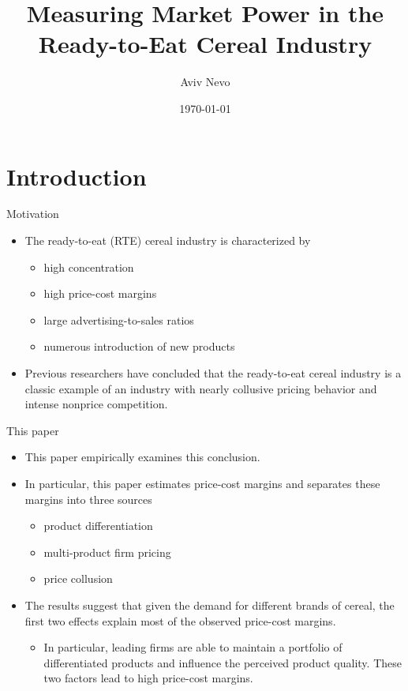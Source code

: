 \documentclass{beamer}
\title[ECMA, 2001]{Measuring Market Power in the Ready-to-Eat Cereal Industry}
\author{Aviv Nevo}
\institute[]{Presenter: Qinzhu Sun}
\date{\today}
\begin{document}
\begin{frame}
\titlepage
\end{frame}

\section{Introduction}
\begin{frame}
	\transfade
	\tableofcontents[sectionstyle=show/shaded,subsectionstyle=show/shaded/hide]
	\addtocounter{framenumber}{-1}
\end{frame}
\begin{frame}[label=motivation]{Motivation}
	\begin{itemize}
		\item The ready-to-eat (RTE) cereal industry is characterized by
		\begin{itemize}
			\item high concentration
			\item high price-cost margins
			\item large advertising-to-sales ratios
			\item numerous introduction of new products
		\end{itemize}
		\item Previous researchers have concluded that the ready-to-eat cereal industry is a classic example of an industry with nearly collusive pricing behavior and intense nonprice competition.
	\end{itemize}
	\hyperlink{history}{}
\end{frame}
\begin{frame}{This paper}
	\begin{itemize}
		\item This paper empirically examines this conclusion.
		\item In particular, this paper estimates price-cost margins and separates these margins into three sources
		\begin{itemize}
			\item product differentiation
			\item multi-product firm pricing
			\item price collusion
		\end{itemize}
		\item The results suggest that given the demand for different brands of cereal, the first two effects explain most of the observed price-cost margins.
		\begin{itemize}
			\item In particular, leading firms are able to maintain a portfolio of differentiated products and influence the perceived product quality. These two factors lead to high price-cost margins.
		\end{itemize}
	\end{itemize}
\end{frame}
\end{document}
